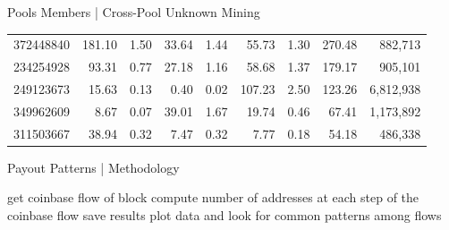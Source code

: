 \documentclass[10pt]{beamer}
\begin{document}
\begin{frame}[fragile]{Pools Members | Cross-Pool Unknown Mining}
\begin{table}[]
{\begin{tabular}{@{}rrrrrrrrr@{}}
            372448840  & 181.10                  & 1.50                      & 33.64                   & 1.44                      & 55.73                   & 1.30                      & 270.48               & 882,713  \\
            234254928  & 93.31                   & 0.77                      & 27.18                   & 1.16                      & 58.68                   & 1.37                      & 179.17               & 905,101   \\
            249123673  & 15.63                   & 0.13                      & 0.40                    & 0.02                      & 107.23                  & 2.50                      & 123.26               & 6,812,938 \\
            349962609  & 8.67                    & 0.07                      & 39.01                   & 1.67                      & 19.74                   & 0.46                      & 67.41                & 1,173,892 \\
            311503667  & 38.94                   & 0.32                      & 7.47                    & 0.32                      & 7.77                    & 0.18                      & 54.18                & 486,338 \\
            \bottomrule
            \end{tabular}
        }
    \end{table}
\end{frame}

\begin{frame}[fragile]{Payout Patterns | Methodology}
    \begin{algorithm}[H]
        \caption{Find payout patterns in BTC.com, AntPool and ViaBTC.}\label{algo:blocks_addresses}
        \begin{algorithmic}[1]
                    \State get coinbase flow of block
                    \State compute number of addresses at each step of the coinbase flow
                    \State save results
                \EndFor
                \State plot data and look for common patterns among flows
            \EndFor
        \end{algorithmic}
    \end{algorithm}
\end{frame}
\end{document}
